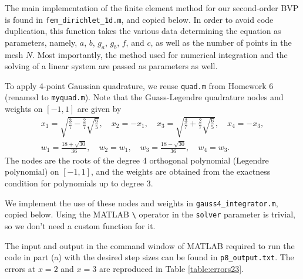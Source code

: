 \documentclass{homework}
\begin{document}
	\question 
	\begin{alphaparts}
		\questionpart 
		The main implementation of the finite element method for our second-order BVP is found in \verb*|fem_dirichlet_1d.m|, and copied below. In order to avoid code duplication, this function takes the various data determining the equation as parameters, namely, $a$, $b$, $g_a$, $g_b$, $f$, and $c$, as well as the number of points in the mesh $N$. Most importantly, the method used for numerical integration and the solving of a linear system are passed as parameters as well.	
		
		
		To apply 4-point Gaussian quadrature, we reuse \verb*|quad.m| from Homework 6 (renamed to \verb*|myquad.m|). Note that the Guass-Legendre quadrature nodes and weights on $[-1,1]$ are given by
		\begin{gather}
			x_1 = \sqrt{\frac{3}{7} - \frac{2}{7}\sqrt{\frac{6}{5}}}, \quad x_2 = -x_1,\quad  x_3 = \sqrt{\frac{3}{7} + \frac{2}{7}\sqrt{\frac{6}{5}}}, \quad x_4 = -x_3, \\
			w_1 = \frac{18 + \sqrt{30}}{36}, \quad w_2 = w_1, \quad w_3 = \frac{18 - \sqrt{30}}{36}, \quad w_4 = w_3.
		\end{gather}
		The nodes are the roots of the degree 4 orthogonal polynomial (Legendre polynomial) on $[-1,1]$, and the weights are obtained from the exactness condition for polynomials up to degree 3.
		
		We implement the use of these nodes and weights in \verb*|gauss4_integrator.m|, copied below. Using the MATLAB \verb*|\| operator in the \verb*|solver| parameter is trivial, so we don't need a custom function for it.
		
		
		\questionpart
		The input and output in the command window of MATLAB required to run the code in part (a) with the desired step sizes can be found in \verb*|p8_output.txt|. The errors at $x=2$ and $x=3$ are reproduced in Table \ref{table:errors23}.
		

\end{alphaparts}
\end{document}
